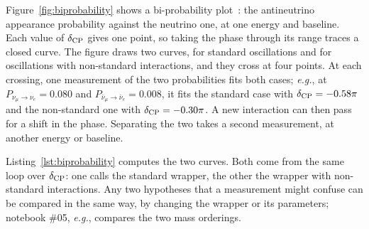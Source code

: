 \documentclass[final,5p,times,twocolumn,sort,compress]{elsarticle}
\makeatletter
\newcommand{\eg}{{\it e.g.}}
\DeclareRobustCommand{\_}{%
  \ifmmode\nfss@text{\textunderscore}\else\textunderscore\allowbreak\fi}
\makeatother
\begin{document}
Figure~\ref{fig:biprobability} shows a bi-probability plot\ \cite{Minakata:2001qm}: the antineutrino appearance probability against the neutrino one, at one energy and baseline. Each value of $\delta_{\rm CP}$ gives one point, so taking the phase through its range traces a closed curve. The figure draws two curves, for standard oscillations and for oscillations with non-standard interactions, and they cross at four points. At each crossing, one measurement of the two probabilities fits both cases; \eg, at $P_{\nu_\mu \to \nu_e} = 0.080$ and $P_{\bar{\nu}_\mu \to \bar{\nu}_e} = 0.008$, it fits the standard case with $\delta_{\rm CP} = -0.58\pi$ and the non-standard one with $\delta_{\rm CP} = -0.30\pi$. A new interaction can then pass for a shift in the phase. Separating the two takes a second measurement, at another energy or baseline.

Listing~\ref{lst:biprobability} computes the two curves. Both come from the same loop over $\delta_{\rm CP}$: one calls the standard wrapper, the other the wrapper with non-standard interactions. Any two hypotheses that a measurement might confuse can be compared in the same way, by changing the wrapper or its parameters; notebook \#05, \eg, compares the two mass orderings.
\end{document}
